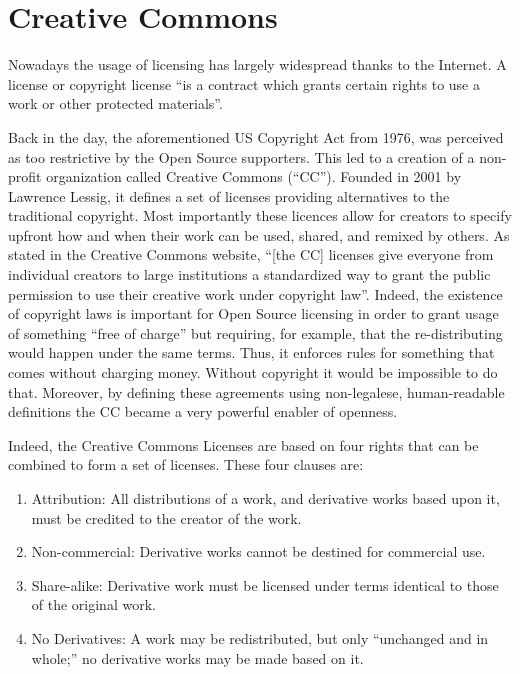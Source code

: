 \section{Creative Commons}
\label{sec:CC}

Nowadays the usage of licensing has largely widespread thanks to the Internet. A license or copyright license “is a contract which grants certain rights to use a work or other protected materials”.

Back in the day, the aforementioned US Copyright Act from 1976, was perceived as too restrictive by the Open Source supporters. This led to a creation of a non-profit organization called Creative Commons (“CC”). Founded in 2001 by Lawrence Lessig, it defines a set of licenses providing alternatives to the traditional copyright. Most importantly these licences allow for creators to specify upfront how and when their work can be used, shared, and remixed by others. As stated in the Creative Commons website, “[the CC] licenses give everyone from individual creators to large institutions a standardized way to grant the public permission to use their creative work under copyright law”.
Indeed, the existence of copyright laws is important for Open Source licensing in order to grant usage of something “free of charge” but requiring, for example, that the re-distributing would happen under the same terms. Thus, it enforces rules for something that comes without charging money. Without copyright it would be impossible to do that. Moreover, by defining these agreements using non-legalese, human-readable definitions the CC became a very powerful enabler of openness.

Indeed, the Creative Commons Licenses are based on four rights that can be combined to form a set of licenses. These four clauses are:

\begin{enumerate}
  \item Attribution: All distributions of a work, and derivative works based upon it, must be credited to the creator of the work.
  \item Non-commercial: Derivative works cannot be destined for commercial use.
  \item Share-alike: Derivative work must be licensed under terms identical to those of the original work.
  \item No Derivatives: A work may be redistributed, but only “unchanged and in whole;” no derivative works may be made based on it.
\end{enumerate}


